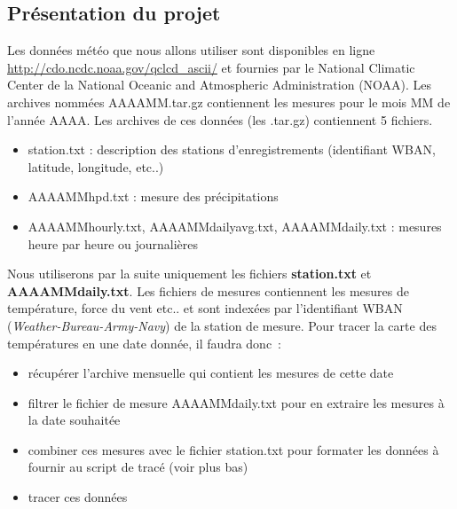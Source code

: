 \subsection{Présentation du projet}

Les données météo que nous allons utiliser sont disponibles en ligne
\url{http://cdo.ncdc.noaa.gov/qclcd_ascii/} et fournies par le
National Climatic Center de la National Oceanic and Atmospheric
Administration (NOAA). Les archives nommées AAAAMM.tar.gz
contiennent les mesures pour le mois MM de l'année AAAA. Les archives de ces données (les .tar.gz)
contiennent 5 fichiers. 
\begin{itemize}
\item station.txt : description des stations d'enregistrements
  (identifiant WBAN, latitude, longitude, etc..)
\item AAAAMMhpd.txt : mesure des précipitations
\item AAAAMMhourly.txt, AAAAMMdailyavg.txt, AAAAMMdaily.txt : mesures
  heure par heure ou journalières\\
\end{itemize}

Nous utiliserons par la suite uniquement les fichiers \textbf{station.txt} et
\textbf{AAAAMMdaily.txt}. Les fichiers de mesures contiennent les mesures de
température, force du vent etc.. et sont indexées par l'identifiant
WBAN (\emph{Weather-Bureau-Army-Navy}) de la station de mesure. Pour tracer la carte des températures en
une date donnée, il faudra donc~:
\begin{itemize}
\item récupérer l'archive mensuelle qui contient les mesures de cette date
\item filtrer le fichier de mesure AAAAMMdaily.txt pour en extraire
  les mesures à la date souhaitée
\item combiner ces mesures avec le fichier station.txt pour formater
  les données à fournir au script de tracé (voir plus bas)
\item tracer ces données
\end{itemize}

